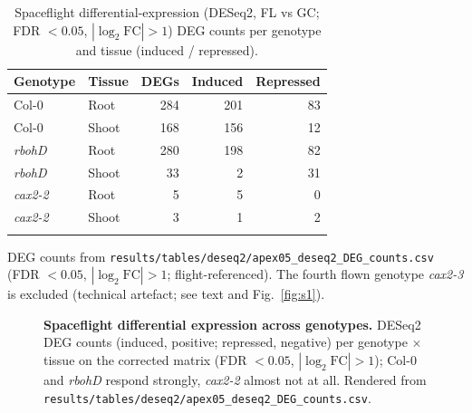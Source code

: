 \documentclass[pdflatex,sn-nature]{sn-jnl}
\begin{document}
\begin{table}[htbp]
\centering
\caption{Spaceflight differential-expression (DESeq2, FL vs GC; FDR \(< 0.05\),
\(|\log_2\text{FC}| > 1\)) DEG counts per genotype and tissue (induced / repressed).}
\label{tab:deg}
\begin{tabular}{@{}llrrr@{}}
\toprule
\textbf{Genotype} & \textbf{Tissue} & \textbf{DEGs} & \textbf{Induced} & \textbf{Repressed} \\
\midrule
Col-0            & Root  & 284 & 201 & 83 \\
Col-0            & Shoot & 168 & 156 & 12 \\
\textit{rbohD}   & Root  & 280 & 198 & 82 \\
\textit{rbohD}   & Shoot & 33  & 2   & 31 \\
\textit{cax2-2}  & Root  & 5   & 5   & 0  \\
\textit{cax2-2}  & Shoot & 3   & 1   & 2  \\
\botrule
\end{tabular}
\par\smallskip
{\footnotesize DEG counts from \texttt{results/tables/deseq2/apex05\_deseq2\_DEG\_counts.csv}
(FDR \(< 0.05\), \(|\log_2\text{FC}| > 1\); flight-referenced). The fourth flown
genotype \textit{cax2-3} is excluded (technical artefact; see text and Fig.~\ref{fig:s1}).}
\end{table}

\begin{figure}[htbp]
\centering
{}
\caption{\textbf{Spaceflight differential expression across genotypes.} DESeq2 DEG
counts (induced, positive; repressed, negative) per genotype \(\times\) tissue on the
corrected matrix (FDR \(< 0.05\), \(|\log_2\text{FC}| > 1\)); Col-0 and \textit{rbohD}
respond strongly, \textit{cax2-2} almost not at all. Rendered from
\texttt{results/tables/deseq2/apex05\_deseq2\_DEG\_counts.csv}.}
\label{fig:2}
\end{figure}
\end{document}
